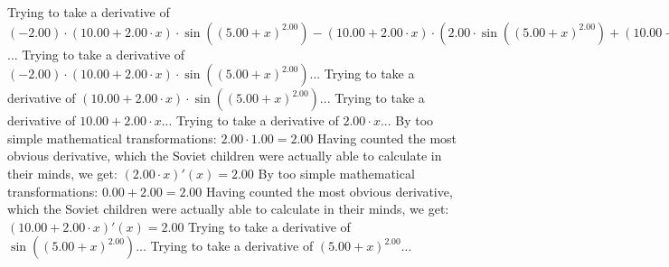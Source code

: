 \documentclass{article}
\begin{document}
\newline
Trying to take a derivative of ${{\left({-2.00}\right) \cdot {\left({{10.00} + {{2.00} \cdot {x}}}\right) \cdot  \sin {\left({\left({{5.00} + {x}}\right) ^ {2.00}}\right)} }} - {\left({{10.00} + {{2.00} \cdot {x}}}\right) \cdot \left({{{2.00} \cdot  \sin {\left({\left({{5.00} + {x}}\right) ^ {2.00}}\right)} } + {\left({{10.00} + {{2.00} \cdot {x}}}\right) \cdot { \cos {\left({\left({{5.00} + {x}}\right) ^ {2.00}}\right)}  \cdot \left({{10.00} + {{2.00} \cdot {x}}}\right)}}}\right)}}$...\newline
\newline
Trying to take a derivative of ${\left({-2.00}\right) \cdot {\left({{10.00} + {{2.00} \cdot {x}}}\right) \cdot  \sin {\left({\left({{5.00} + {x}}\right) ^ {2.00}}\right)} }}$...\newline
\newline
Trying to take a derivative of ${\left({{10.00} + {{2.00} \cdot {x}}}\right) \cdot  \sin {\left({\left({{5.00} + {x}}\right) ^ {2.00}}\right)} }$...\newline
\newline
Trying to take a derivative of ${{10.00} + {{2.00} \cdot {x}}}$...\newline
\newline
Trying to take a derivative of ${{2.00} \cdot {x}}$...\newline
\newline
By too simple mathematical transformations:
 ${{2.00} \cdot {1.00}} = {2.00}$ 
 \newline
 \newline 
Having counted the most obvious derivative, which the Soviet children were actually able to calculate in their minds, we get:
$({{2.00} \cdot {x}})'(x) = {2.00}$\newline
\newline
By too simple mathematical transformations:
 ${{0.00} + {2.00}} = {2.00}$ 
 \newline
 \newline 
Having counted the most obvious derivative, which the Soviet children were actually able to calculate in their minds, we get:
$({{10.00} + {{2.00} \cdot {x}}})'(x) = {2.00}$\newline
\newline
Trying to take a derivative of $ \sin {\left({\left({{5.00} + {x}}\right) ^ {2.00}}\right)} $...\newline
\newline
Trying to take a derivative of ${\left({{5.00} + {x}}\right) ^ {2.00}}$...\newline
\end{document}
